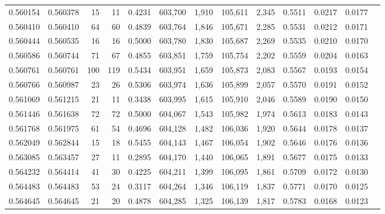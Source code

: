 \begin{tabular}{rrrrrrrrrrrrr}
0.560154 & 0.560378 &    15 &    11 &                                     0.4231 & 603,700 &   1,910 & 105,611 &   2,345 & 0.5511 & 0.0217 & 0.0177 \\
0.560410 & 0.560410 &    64 &    60 &                                     0.4839 & 603,764 &   1,846 & 105,671 &   2,285 & 0.5531 & 0.0212 & 0.0171 \\
0.560444 & 0.560535 &    16 &    16 &                                     0.5000 & 603,780 &   1,830 & 105,687 &   2,269 & 0.5535 & 0.0210 & 0.0170 \\
0.560586 & 0.560744 &    71 &    67 &                                     0.4855 & 603,851 &   1,759 & 105,754 &   2,202 & 0.5559 & 0.0204 & 0.0163 \\
0.560761 & 0.560761 &   100 &   119 &                                     0.5434 & 603,951 &   1,659 & 105,873 &   2,083 & 0.5567 & 0.0193 & 0.0154 \\
0.560766 & 0.560987 &    23 &    26 &                                     0.5306 & 603,974 &   1,636 & 105,899 &   2,057 & 0.5570 & 0.0191 & 0.0152 \\
0.561069 & 0.561215 &    21 &    11 &                                     0.3438 & 603,995 &   1,615 & 105,910 &   2,046 & 0.5589 & 0.0190 & 0.0150 \\
0.561446 & 0.561638 &    72 &    72 &                                     0.5000 & 604,067 &   1,543 & 105,982 &   1,974 & 0.5613 & 0.0183 & 0.0143 \\
0.561768 & 0.561975 &    61 &    54 &                                     0.4696 & 604,128 &   1,482 & 106,036 &   1,920 & 0.5644 & 0.0178 & 0.0137 \\
0.562049 & 0.562844 &    15 &    18 &                                     0.5455 & 604,143 &   1,467 & 106,054 &   1,902 & 0.5646 & 0.0176 & 0.0136 \\
0.563085 & 0.563457 &    27 &    11 &                                     0.2895 & 604,170 &   1,440 & 106,065 &   1,891 & 0.5677 & 0.0175 & 0.0133 \\
0.564232 & 0.564414 &    41 &    30 &                                     0.4225 & 604,211 &   1,399 & 106,095 &   1,861 & 0.5709 & 0.0172 & 0.0130 \\
0.564483 & 0.564483 &    53 &    24 &                                     0.3117 & 604,264 &   1,346 & 106,119 &   1,837 & 0.5771 & 0.0170 & 0.0125 \\
0.564645 & 0.564645 &    21 &    20 &                                     0.4878 & 604,285 &   1,325 & 106,139 &   1,817 & 0.5783 & 0.0168 & 0.0123 \\

\end{tabular}
